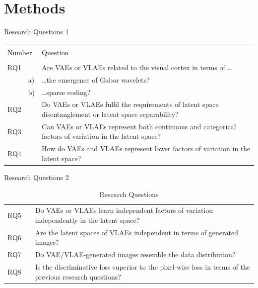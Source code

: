 \documentclass{beamer}
\begin{document}
    \section{Methods}
    \begin{frame}{Research Questions 1}
        \begin{table}[H]
            \begin{tabularx}{\textwidth}{llX}
                \toprule \\
                \multicolumn{2}{l}{Number} & Question \\
                \midrule \\
                RQ1 &    & Are VAEs or VLAEs related to the visual cortex in terms of \ldots                                      \\
                & a) & \hspace{1cm} \ldots the emergence of Gabor wavelets?                                                   \\
                & b) & \hspace{1cm} \ldots sparse coding?                                                                     \\
                RQ2 &    & Do VAEs or VLAEs fulfil the requirements of latent space disentanglement or latent space separability? \\
                RQ3 &    & Can VAEs or VLAEs represent both continuous and categorical factors of variation in the latent space?  \\
                RQ4 &    & How do VAEs and VLAEs represent lower factors of variation in the latent space?                        \\
            \end{tabularx}
        \end{table}
    \end{frame}
    \begin{frame}{Research Questions 2}
        \begin{table}[H]
\begin{tabularx}{\textwidth}{llX}
RQ5 & & Do VAEs or VLAEs learn independent factors of variation independently in the latent space?              \\
RQ6 & & Are the latent spaces of VLAEs independent in terms of generated images?                                \\
RQ7 & & Do VAE/VLAE-generated images resemble the data distribution?                                            \\
RQ8 & & Is the discriminative loss superior to the pixel-wise loss in terms of the previous research questions? \\
\bottomrule
\end{tabularx}
\caption{Research Questions}
\end{table}
\end{frame}
\end{document}
